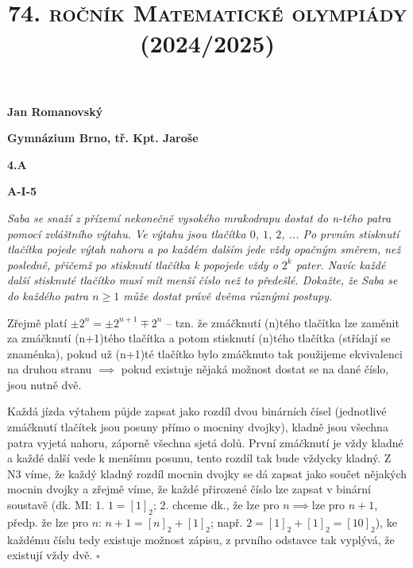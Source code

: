 \documentclass{article}
\title{\normalsize{\vspace{-2cm}\textsc{74. ročník Matematické olympiády (2024/2025)}\vspace{-1.7cm}}}
\date{}
\author{}
\begin{document}
\maketitle

\textbf{ }

\noindent \textbf{Jan Romanovský}

\noindent \textbf{Gymnázium Brno, tř. Kpt. Jaroše}

\noindent \textbf{4.A}

\noindent \textbf{A-\textrm{I}-5}

\textbf{ }

\textit{Saba se snaží z přízemí nekonečně vysokého mrakodrapu dostat do n-tého patra pomocí zvláštního výtahu. Ve výtahu jsou tlačítka $0$, $1$, $2$, ... Po prvním stisknutí tlačítka pojede výtah nahoru a po každém dalším jede vždy opačným směrem, než posledně, přičemž po stisknutí tlačítka k popojede vždy o $2^k$ pater. Navíc každé další stisknuté tlačítko musí mít menší číslo než to předešlé. Dokažte, že Saba se do každého patra $n \geq 1$ může dostat právě dvěma různými postupy.}

\textbf{ }

Zřejmě platí $\pm 2^n = \pm 2^{n+1} \mp 2^{n}$ -- tzn. že zmáčknutí (n)tého tlačítka lze zaměnit za zmáčknutí (n+1)tého tlačítka a potom stisknutí (n)tého tlačítka (střídají se znaménka), pokud už (n+1)té tlačítko bylo zmáčknuto tak použijeme ekvivalenci na druhou stranu $\implies$ pokud existuje nějaká možnost dostat se na dané číslo, jsou nutně dvě.

\textbf{ }

Každá jízda výtahem půjde zapsat jako rozdíl dvou binárních čísel (jednotlivé zmáčknutí tlačítek jsou posuny přímo o mocniny dvojky), kladně jsou všechna patra vyjetá nahoru, záporně všechna sjetá dolů. První zmáčknutí je vždy kladné a každé další vede k menšímu posunu, tento rozdíl tak bude vždycky kladný. Z N3 víme, že každý kladný rozdíl mocnin dvojky se dá zapsat jako součet nějakých mocnin dvojky a zřejmě víme, že každé přirozené číslo lze zapsat v binární soustavě (dk. MI: 1. $1 = [1]_2$; 2. chceme dk., že lze pro $n \implies$lze pro $n+1$, předp. že lze pro $n$: $n+1 = [n]_2 + [1]_2$; např. $2 = [1]_2 + [1]_2 = [10]_2$), ke každému číslu tedy existuje možnost zápisu, z prvního odstavce tak vyplývá, že existují vždy dvě. $\square$
\end{document}
